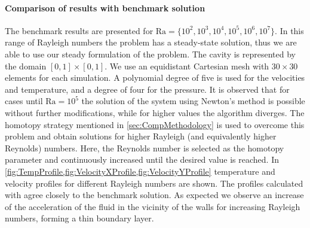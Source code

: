 \paragraph{Comparison of results with benchmark solution}
The benchmark results \cite{vierendeelsBenchmarkSolutionsNatural2003} are presented for $\text{Ra} = \{10^2,10^3,10^4,10^5,10^6,10^7\}$. In this range of Rayleigh numbers the problem has a steady-state solution, thus we are able to use our steady formulation of the problem. The cavity is represented by the domain $[0,1]\times[0,1]$. We use an equidistant Cartesian mesh with $30 \times 30$ elements for each simulation. A polynomial degree of five is used for the velocities and temperature, and a degree of four for the pressure. 
It is observed that for cases until  $\text{Ra} = 10^5$ the solution of the system using Newton's method is possible without further modifications, while for higher values the algorithm diverges. The homotopy strategy mentioned in \cref{sec:CompMethodology} is used to overcome this problem and obtain solutions for higher Rayleigh (and equivalently higher Reynolds) numbers. Here, the Reynolds number is selected as the homotopy parameter and continuously increased until the desired value is reached.
In \cref{fig:TempProfile,fig:VelocityXProfile,fig:VelocityYProfile} temperature and velocity profiles for different Rayleigh numbers are shown. The profiles calculated with \BoSSS agree closely to the benchmark solution. As expected we observe 
an increase of the acceleration of the fluid in the vicinity of the walls for increasing Rayleigh numbers, forming a thin boundary layer. 



